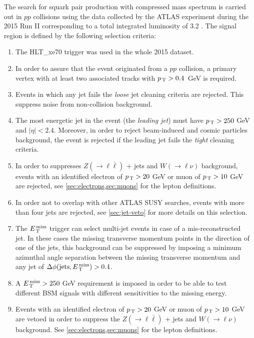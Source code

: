 The search for squark pair production with compressed mass spectrum is carried
out in $pp$ collisions using the data collected by the ATLAS experiment during
the 2015 Run II corresponding to a total integrated luminosity of 3.2 \ifb. The
signal region is defined by the following selection criteria:
\begin{enumerate}[A -]
\item The HLT\_xe70 trigger was used in the whole 2015 dataset.
\item In order to assure that the event originated from a $pp$ collision, a
  primary vertex with at least two associated tracks with $p_\mathrm{\, T} > 0.4$~GeV is
  required.
\item Events in which any jet fails the \emph{loose} jet cleaning criteria are
  rejected. This suppress noise from non-collision background.
\item The most energetic jet in the event (the \emph{leading jet}) must have
  $p_\mathrm{\, T} > 250~$GeV and $|\eta| < 2.4$. Moreover, in order to reject beam-induced
  and cosmic particles background, the event is rejected if the leading jet
  fails the \emph{tight} cleaning criteria.
\item In order to suppresses $Z (\rightarrow \ell \bar{\ell})$ + jets and
  $W (\rightarrow \ell \nu)$ background, events with an identified electron of
  $p_\mathrm{\, T} > 20~$GeV or muon of $p_\mathrm{\, T} > 10~$GeV are rejected, see
  \cref{sec:electrons,sec:muons} for the lepton definitions.
\item In order not to overlap with other ATLAS SUSY searches, events with more
  than four jets are rejected, see \cref{sec:jet-veto} for more details on this
  selection.
\item The $E_\mathrm{\, T}^\mathrm{\, miss}$ trigger can select multi-jet events in case of a
  mis-reconstructed jet. In these cases the missing transverse momentum points
  in the direction of one of the jets, this background can be suppressed by
  imposing a minimum azimuthal angle separation between the missing transverse
  momentum and any jet of $\Delta \phi (\mathrm{jets}, E_\mathrm{\, T}^\mathrm{\, miss}) > 0.4$.
\item A $E_\mathrm{\, T}^\mathrm{\, miss} > 250~$GeV requirement is imposed in order to be able to test
  different BSM signals with different sensitivities to the missing energy.
\item Events with an identified electron of $p_\mathrm{\, T} > 20~$GeV or muon of
  $p_\mathrm{\, T} > 10~$GeV are vetoed in order to suppress the
  $Z (\rightarrow \ell \bar{\ell})$ + jets and $W (\rightarrow \ell \nu)$
  background. See \cref{sec:electrons,sec:muons} for the lepton definitions.
\end{enumerate}
